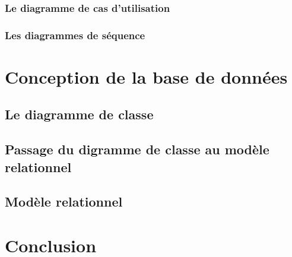 \subsubsection{Le diagramme de cas d'utilisation}
\subsubsection{Les diagrammes de séquence}


\section{Conception de la base de données}
\subsection{Le diagramme de classe}
\subsection{Passage du digramme de classe au modèle relationnel}
\subsection{Modèle relationnel}

\section{Conclusion}